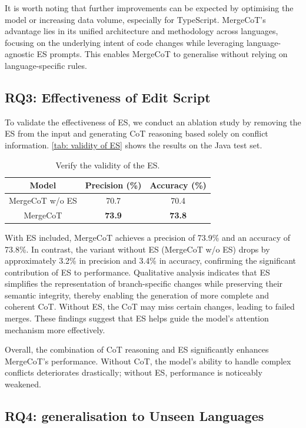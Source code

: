 \documentclass[sigconf,review,anonymous]{acmart}
\begin{document}
It is worth noting that further improvements can be expected by optimising the model or increasing data volume, especially for TypeScript. MergeCoT’s advantage lies in its unified architecture and methodology across languages, focusing on the underlying intent of code changes while leveraging language-agnostic ES prompts. This enables MergeCoT to generalise without relying on language-specific rules.

\subsection{RQ3: Effectiveness of Edit Script}
To validate the effectiveness of ES, we conduct an ablation study by removing the ES from the input and generating CoT reasoning based solely on conflict information. \autoref{tab: validity of ES} shows the results on the Java test set.

\begin{table}[H]
\caption{Verify the validity of the ES.}
\begin{tabular}{ccc}
\hline
Model           & Precision (\%) & Accuracy (\%) \\ \hline
MergeCoT w/o ES & 70.7           & 70.4          \\
MergeCoT        & \textbf{73.9}  & \textbf{73.8}   \\ \hline
\end{tabular}
\label{tab: validity of ES}
\end{table}

With ES included, MergeCoT achieves a precision of 73.9\% and an accuracy of 73.8\%. In contrast, the variant without ES (MergeCoT w/o ES) drops by approximately 3.2\% in precision and 3.4\% in accuracy, confirming the significant contribution of ES to performance. Qualitative analysis indicates that ES simplifies the representation of branch-specific changes while preserving their semantic integrity, thereby enabling the generation of more complete and coherent CoT. Without ES, the CoT may miss certain changes, leading to failed merges. These findings suggest that ES helps guide the model’s attention mechanism more effectively.

Overall, the combination of CoT reasoning and ES significantly enhances MergeCoT’s performance. Without CoT, the model's ability to handle complex conflicts deteriorates drastically; without ES, performance is noticeably weakened.

\subsection{RQ4: generalisation to Unseen Languages}
\end{document}
